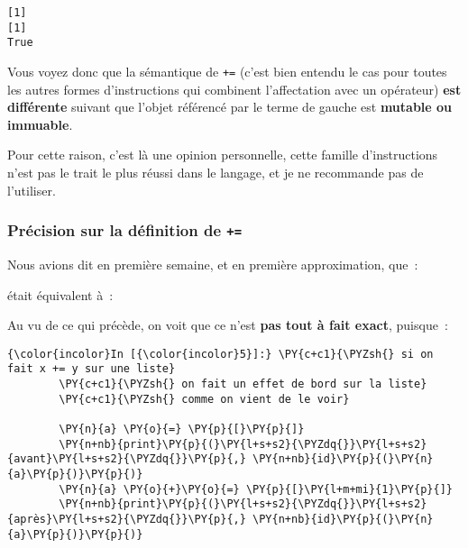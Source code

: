     \begin{Verbatim}[commandchars=\\\{\}]
[1]
[1]
True

    \end{Verbatim}

    Vous voyez donc que la sémantique de \texttt{+=} (c'est bien entendu le
cas pour toutes les autres formes d'instructions qui combinent
l'affectation avec un opérateur) \textbf{est différente} suivant que
l'objet référencé par le terme de gauche est \textbf{mutable ou
immuable}.

    Pour cette raison, c'est là une opinion personnelle, cette famille
d'instructions n'est pas le trait le plus réussi dans le langage, et je
ne recommande pas de l'utiliser.

    \hypertarget{pruxe9cision-sur-la-duxe9finition-de}{%
\subsubsection{\texorpdfstring{Précision sur la définition de
\texttt{+=}}{Précision sur la définition de +=}}\label{pruxe9cision-sur-la-duxe9finition-de}}

    Nous avions dit en première semaine, et en première approximation, que~:

\begin{Shaded}
\begin{Highlighting}[]
\OperatorTok{+=}
\end{Highlighting}
\end{Shaded}

était équivalent à~:

\begin{Shaded}
\begin{Highlighting}[]
\OperatorTok{=}\OperatorTok{+}
\end{Highlighting}
\end{Shaded}

    Au vu de ce qui précède, on voit que ce n'est \textbf{pas tout à fait
exact}, puisque~:

    \begin{Verbatim}[commandchars=\\\{\}]
{\color{incolor}In [{\color{incolor}5}]:} \PY{c+c1}{\PYZsh{} si on fait x += y sur une liste}
        \PY{c+c1}{\PYZsh{} on fait un effet de bord sur la liste}
        \PY{c+c1}{\PYZsh{} comme on vient de le voir}
        
        \PY{n}{a} \PY{o}{=} \PY{p}{[}\PY{p}{]}
        \PY{n+nb}{print}\PY{p}{(}\PY{l+s+s2}{\PYZdq{}}\PY{l+s+s2}{avant}\PY{l+s+s2}{\PYZdq{}}\PY{p}{,} \PY{n+nb}{id}\PY{p}{(}\PY{n}{a}\PY{p}{)}\PY{p}{)}
        \PY{n}{a} \PY{o}{+}\PY{o}{=} \PY{p}{[}\PY{l+m+mi}{1}\PY{p}{]}
        \PY{n+nb}{print}\PY{p}{(}\PY{l+s+s2}{\PYZdq{}}\PY{l+s+s2}{après}\PY{l+s+s2}{\PYZdq{}}\PY{p}{,} \PY{n+nb}{id}\PY{p}{(}\PY{n}{a}\PY{p}{)}\PY{p}{)}
\end{Verbatim}


